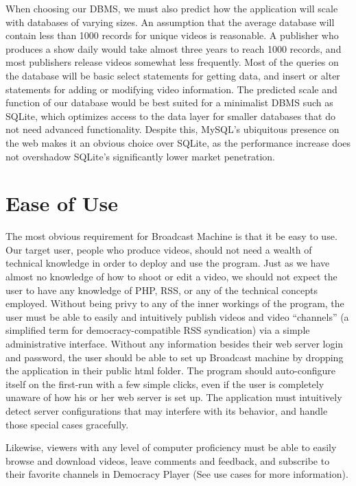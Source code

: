 \documentclass[a4paper,12pt]{report}
\begin{document}
When choosing our DBMS, we must also predict how the application will scale with databases of varying sizes. An assumption that the average database will contain less than 1000 records for unique videos is reasonable. A publisher who produces a show daily would take almost three years to reach 1000 records, and most publishers release videos somewhat less frequently. Most of the queries on the database will be basic select statements for getting data, and insert or alter statements for adding or modifying video information. The predicted scale and function of our database would be best suited for a minimalist DBMS such as SQLite, which optimizes access to the data layer for smaller databases that do not need advanced functionality. Despite this, MySQL’s ubiquitous presence on the web makes it an obvious choice over SQLite, as the performance increase does not overshadow SQLite’s significantly lower market penetration.

\section{Ease of Use}

	The most obvious requirement for Broadcast Machine is that it be easy to use. Our target user, people who produce videos, should not need a wealth of technical knowledge in order to deploy and use the program. Just as we have almost no knowledge of how to shoot or edit a video, we should not expect the user to have any knowledge of PHP, RSS, or any of the technical concepts employed. Without being privy to any of the inner workings of the program, the user must be able to easily and intuitively publish videos and video “channels” (a simplified term for democracy-compatible RSS syndication) via a simple administrative interface. Without any information besides their web server login and password, the user should be able to set up Broadcast machine by dropping the application in their public html folder. The program should auto-configure itself on the first-run with a few simple clicks, even if the user is completely unaware of how his or her web server is set up. The application must intuitively detect server configurations that may interfere with its behavior, and handle those special cases gracefully.

Likewise, viewers with any level of computer proficiency must be able to easily browse and download videos, leave comments and feedback, and subscribe to their favorite channels in Democracy Player (See use cases for more information).
\end{document}
